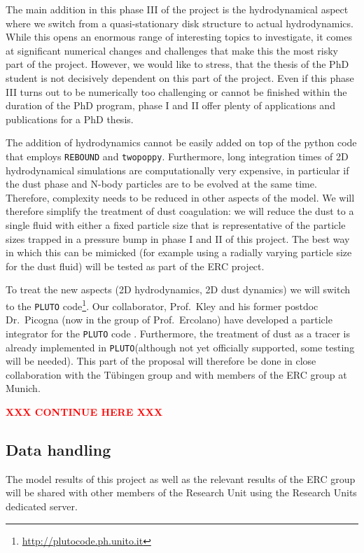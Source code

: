 \documentclass[10pt,fleqn,twoside]{article}
\newcommand{\missing}[1]{\textcolor{red}{\textbf{XXX #1 XXX}}}
\newcommand{\twopoppy}{\texttt{twopoppy}\xspace}
\newcommand{\rebound}{\texttt{REBOUND}\xspace}
\newcommand{\pluto}{\texttt{PLUTO}\xspace}
\begin{document}
The main addition in this phase III of the project is the
hydrodynamical aspect where we switch from a quasi-stationary disk
structure to actual hydrodynamics. While this opens an enormous range
of interesting topics to investigate, it comes at significant
numerical changes and challenges that make this the most risky part of
the project. However, we would like to stress, that the thesis of the
PhD student is not decisively dependent on this part of the project.
Even if this phase III turns out to be numerically too challenging or
cannot be finished within the duration of the PhD program, phase I and
II offer plenty of applications and publications for a PhD thesis.

The addition of hydrodynamics cannot be easily added on top of the
python code that employs \rebound and \twopoppy. Furthermore, long
integration times of 2D hydrodynamical simulations are computationally
very expensive, in particular if the dust phase and N-body particles
are to be evolved at the same time. Therefore, complexity needs to be
reduced in other aspects of the model. We will therefore simplify the
treatment of dust coagulation: we will reduce the dust to a single
fluid with either a fixed particle size that is representative of the
particle sizes trapped in a pressure bump in phase I and II of this
project. The best way in which this can be mimicked (for example using
a radially varying particle size for the dust fluid) will be tested as
part of the ERC project.

To treat the new aspects (2D hydrodynamics, 2D dust dynamics) we will
switch to the \pluto
code\footnote{\url{http://plutocode.ph.unito.it}}. Our collaborator,
Prof.~Kley and his former postdoc Dr.\ Picogna (now in the group of
Prof.~Ercolano) have developed a particle integrator for the \pluto
code \citep[see][]{2015A&A...584A.110P}. Furthermore, the treatment of
dust as a tracer is already implemented in \pluto (although not yet
officially supported, some testing will be needed). This part of the
proposal will therefore be done in close collaboration with the
Tübingen group and with members of the ERC group at Munich.

\missing{CONTINUE HERE}


\subsection{Data handling}

The model results of this project as well as the relevant results of
the ERC group will be shared with other members of the Research Unit
using the Research Units dedicated server.
\end{document}
